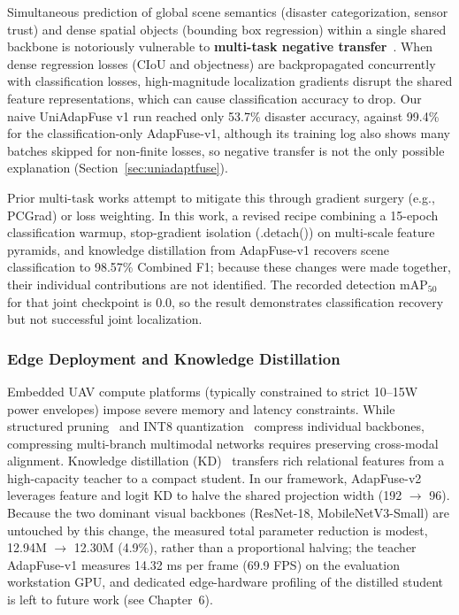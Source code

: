 \documentclass[journal]{IEEEtran}
\begin{document}
Simultaneous prediction of global scene semantics (disaster categorization, sensor trust) and dense spatial objects (bounding box regression) within a single shared backbone is notoriously vulnerable to \textbf{multi-task negative transfer}~\cite{yu2020gradient}. When dense regression losses (CIoU and objectness) are backpropagated concurrently with classification losses, high-magnitude localization gradients disrupt the shared feature representations, which can cause classification accuracy to drop. Our naive UniAdapFuse v1 run reached only 53.7\% disaster accuracy, against 99.4\% for the classification-only AdapFuse-v1, although its training log also shows many batches skipped for non-finite losses, so negative transfer is not the only possible explanation (Section~\ref{sec:uniadaptfuse}).

Prior multi-task works attempt to mitigate this through gradient surgery (e.g., PCGrad) or loss weighting. In this work, a revised recipe combining a 15-epoch classification warmup, stop-gradient isolation (.detach()) on multi-scale feature pyramids, and knowledge distillation from AdapFuse-v1 recovers scene classification to 98.57\% Combined F1; because these changes were made together, their individual contributions are not identified. The recorded detection $\mathrm{mAP}_{50}$ for that joint checkpoint is 0.0, so the result demonstrates classification recovery but not successful joint localization.

\subsubsection{Edge Deployment and Knowledge Distillation}

Embedded UAV compute platforms (typically constrained to strict 10--15W power envelopes) impose severe memory and latency constraints. While structured pruning~\cite{zhu2017prune} and INT8 quantization~\cite{jacob2018quantization} compress individual backbones, compressing multi-branch multimodal networks requires preserving cross-modal alignment. Knowledge distillation (KD)~\cite{hinton2015distilling} transfers rich relational features from a high-capacity teacher to a compact student. In our framework, AdapFuse-v2 leverages feature and logit KD to halve the shared projection width (192 $\to$ 96). Because the two dominant visual backbones (ResNet-18, MobileNetV3-Small) are untouched by this change, the measured total parameter reduction is modest, 12.94M $\to$ 12.30M (4.9\%), rather than a proportional halving; the teacher AdapFuse-v1 measures 14.32 ms per frame (69.9 FPS) on the evaluation workstation GPU, and dedicated edge-hardware profiling of the distilled student is left to future work (see Chapter~6).
\end{document}
